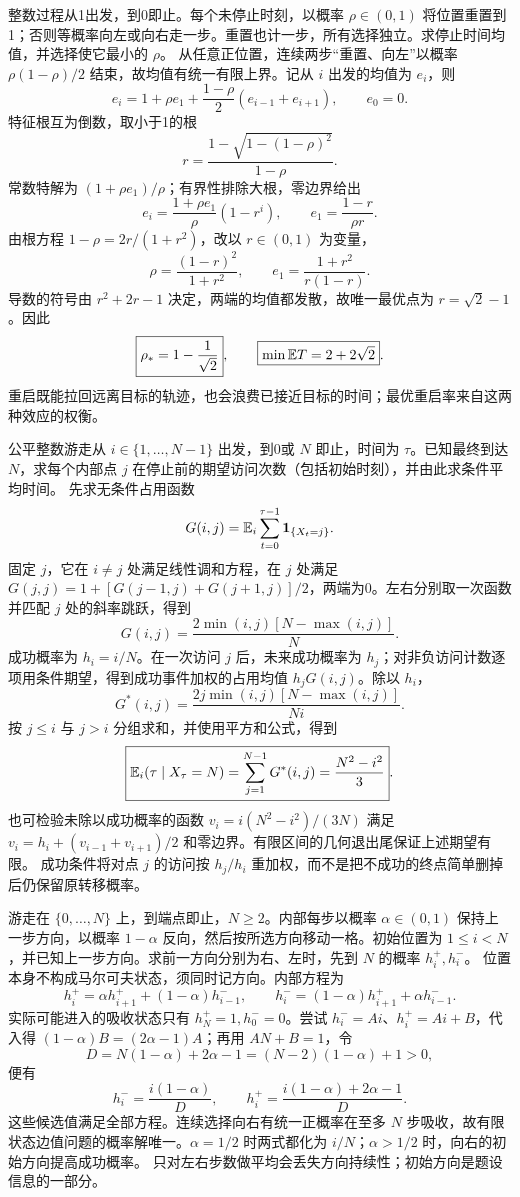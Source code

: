 整数过程从1出发，到0即止。每个未停止时刻，以概率 $\rho\in(0,1)$ 将位置重置到1；否则等概率向左或向右走一步。重置也计一步，所有选择独立。求停止时间均值，并选择使它最小的 $\rho$。
\solution 从任意正位置，连续两步“重置、向左”以概率 $\rho(1-\rho)/2$ 结束，故均值有统一有限上界。记从 $i$ 出发的均值为 $e_i$，则
\[
 e_i=1+\rho e_1+\frac{1-\rho}{2}(e_{i-1}+e_{i+1}),
 \qquad e_0=0.
\]
特征根互为倒数，取小于1的根
\[
 r=\frac{1-\sqrt{1-(1-\rho)^2}}{1-\rho}.
\]
常数特解为 $(1+\rho e_1)/\rho$；有界性排除大根，零边界给出
\[
 e_i=\frac{1+\rho e_1}{\rho}(1-r^i),\qquad
 \boxed{e_1=\frac{1-r}{\rho r}}.
\]
由根方程 $1-\rho=2r/(1+r^2)$，改以 $r\in(0,1)$ 为变量，
\[
 \rho=\frac{(1-r)^2}{1+r^2},\qquad
 e_1=\frac{1+r^2}{r(1-r)}.
\]
导数的符号由 $r^2+2r-1$ 决定，两端的均值都发散，故唯一最优点为 $r=\sqrt2-1$。因此
\[
 \boxed{\rho_*=1-\frac1{\sqrt2}},\qquad
 \boxed{\min\mathbb{E} T=2+2\sqrt2}.
\]
\insight 重启既能拉回远离目标的轨迹，也会浪费已接近目标的时间；最优重启率来自这两种效应的权衡。

公平整数游走从 $i\in\{1,\ldots,N-1\}$ 出发，到0或 $N$ 即止，时间为 $\tau$。已知最终到达 $N$，求每个内部点 $j$ 在停止前的期望访问次数（包括初始时刻），并由此求条件平均时间。
\solution 先求无条件占用函数
\[
 G(i,j)=\mathbb{E}_i\sum_{t=0}^{\tau-1}\mathbf{1}_{\{X_t=j\}}.
\]
固定 $j$，它在 $i\ne j$ 处满足线性调和方程，在 $j$ 处满足 $G(j,j)=1+[G(j-1,j)+G(j+1,j)]/2$，两端为0。左右分别取一次函数并匹配 $j$ 处的斜率跳跃，得到
\[
 G(i,j)=\frac{2\min(i,j)[N-\max(i,j)]}{N}.
\]
成功概率为 $h_i=i/N$。在一次访问 $j$ 后，未来成功概率为 $h_j$；对非负访问计数逐项用条件期望，得到成功事件加权的占用均值 $h_jG(i,j)$。除以 $h_i$，
\[
 \boxed{G^*(i,j)=\frac{2j\min(i,j)[N-\max(i,j)]}{Ni}}.
\]
按 $j\le i$ 与 $j>i$ 分组求和，并使用平方和公式，得到
\[
 \boxed{\mathbb{E}_i(\tau\mid X_\tau=N)=\sum_{j=1}^{N-1}G^*(i,j)
 =\frac{N^2-i^2}{3}}.
\]
也可检验未除以成功概率的函数 $v_i=i(N^2-i^2)/(3N)$ 满足 $v_i=h_i+(v_{i-1}+v_{i+1})/2$ 和零边界。有限区间的几何退出尾保证上述期望有限。
\insight 成功条件将对点 $j$ 的访问按 $h_j/h_i$ 重加权，而不是把不成功的终点简单删掉后仍保留原转移概率。

游走在 $\{0,\ldots,N\}$ 上，到端点即止，$N\ge2$。内部每步以概率 $\alpha\in(0,1)$ 保持上一步方向，以概率 $1-\alpha$ 反向，然后按所选方向移动一格。初始位置为 $1\le i<N$，并已知上一步方向。求前一方向分别为右、左时，先到 $N$ 的概率 $h_i^+,h_i^-$。
\solution 位置本身不构成马尔可夫状态，须同时记方向。内部方程为
\[
 h_i^+=\alpha h_{i+1}^++(1-\alpha)h_{i-1}^-,\qquad
 h_i^-=(1-\alpha)h_{i+1}^++\alpha h_{i-1}^-.
\]
实际可能进入的吸收状态只有 $h_N^+=1,h_0^-=0$。尝试 $h_i^-=Ai$、$h_i^+=Ai+B$，代入得 $(1-\alpha)B=(2\alpha-1)A$；再用 $AN+B=1$，令
\[
 D=N(1-\alpha)+2\alpha-1=(N-2)(1-\alpha)+1>0,
\]
便有
\[
 \boxed{h_i^- =\frac{i(1-\alpha)}D,\qquad
 h_i^+=\frac{i(1-\alpha)+2\alpha-1}D}.
\]
这些候选值满足全部方程。连续选择向右有统一正概率在至多 $N$ 步吸收，故有限状态边值问题的概率解唯一。$\alpha=1/2$ 时两式都化为 $i/N$；$\alpha>1/2$ 时，向右的初始方向提高成功概率。
\insight 只对左右步数做平均会丢失方向持续性；初始方向是题设信息的一部分。

